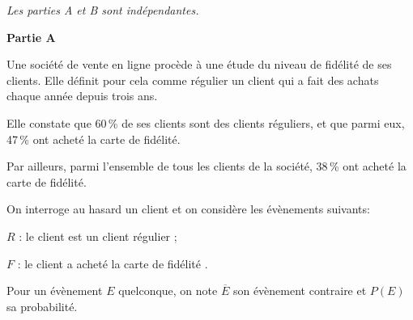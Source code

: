 
\medskip

\emph{Les parties {\rm A} et {\rm B} sont indépendantes.}

\medskip

\textbf{Partie A}

\medskip

Une société de vente en ligne procède à une étude du niveau de fidélité de ses clients. Elle définit pour cela comme \og régulier\fg{} un client qui a fait des achats chaque année depuis trois ans.

Elle constate que 60\,\% de ses clients sont des clients réguliers, et que parmi eux, 47\,\% ont acheté la carte de fidélité.

Par ailleurs, parmi l'ensemble de tous les clients de la société, 38\,\% ont acheté la carte de fidélité.

\begin{list}{\textbullet}{On interroge au hasard un client et on considère les évènements suivants:}
\item $R$ : \og le client est un client régulier\fg{} ;
\item $F$ : \og le client a acheté la carte de fidélité \fg.
\end{list}


Pour un évènement $E$ quelconque, on note $\overline{E}$ son évènement contraire et $P(E)$ sa probabilité.

\medskip

